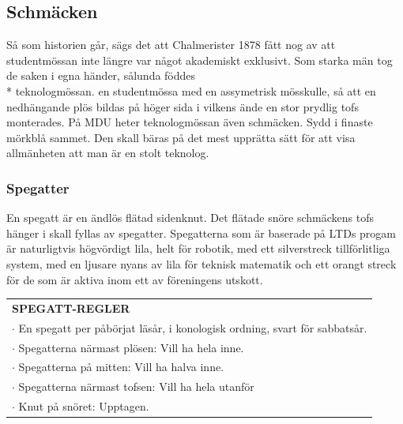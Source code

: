 
\subsection*{\textbf{Schmäcken}}
Så som historien går, sägs det att Chalmerister 1878 fått nog av att studentmössan inte  längre var något akademiskt exklusivt.
Som starka män tog de saken i egna händer, sålunda föddes\\* teknologmössan. en studentmössa med en assymetrisk mösskulle, så att
en nedhängande plös bildas på höger sida i vilkens ände en stor prydlig tofs monterades. På MDU heter teknologmössan även schmäcken. Sydd i finaste mörkblå sammet.
Den skall bäras på det mest upprätta sätt för att visa allmänheten att man är en stolt teknolog.

\subsubsection*{\textbf{Spegatter}}
En spegatt är en ändlös flätad sidenknut. Det flätade snöre schmäckens tofs hänger i skall fyllas av spegatter.
Spegatterna som är baserade på LTDs progam är naturligtvis högvördigt lila, helt för robotik, med ett silverstreck tillförlitliga system,
med en ljusare nyans av lila för teknisk matematik och ett orangt streck för de som är aktiva inom ett av föreningens utskott.\\
\begin{tabular}{p{\textwidth}}
    \textbf{SPEGATT-REGLER} \\
    $\cdot$ En spegatt per påbörjat läsår, i konologisk ordning, svart för sabbatsår.\\
    $\cdot$ Spegatterna närmast plösen: Vill ha hela inne.\\
    $\cdot$ Spegatterna på mitten: Vill ha halva inne.\\
    $\cdot$ Spegatterna närmast tofsen: Vill ha hela utanför \\
    $\cdot$ Knut på snöret: Upptagen.\\
\end{tabular}

